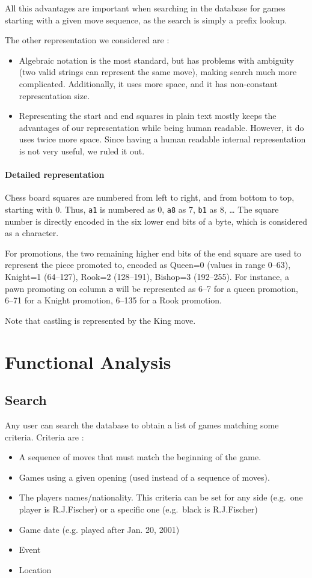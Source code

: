 \documentclass{article}
\begin{document}
All this advantages are important when searching in the database for games starting
with a given move sequence, as the search is simply a prefix lookup.

The other representation we considered are :
\begin{itemize}
\item Algebraic notation is the most standard, but has problems with ambiguity
(two valid strings can represent the same move), making search much more complicated.
Additionally, it uses more space, and it has non-constant representation size.

\item Representing the start and end squares in plain text mostly keeps the advantages
of our representation while being human readable. However, it do uses twice more space.
Since having a human readable internal representation is not very useful,
we ruled it out.
\end{itemize}


\paragraph{Detailed representation}
Chess board squares are numbered from left to right, and from bottom to top,
starting with 0. Thus, \verb|a1| is numbered as 0, \verb|a8| as 7, \verb|b1| as 8, \dots
The square number is directly encoded in the six lower end bits of a byte, which is considered as a character.

For promotions, the two remaining higher end bits of the end square are used to represent the piece promoted to,
encoded as Queen=0 (values in range 0--63), Knight=1 (64--127), Rook=2 (128--191), Bishop=3 (192--255).
For instance, a pawn promoting on column \verb|a| will be represented as 6--7 for a queen promotion,
6--71 for a Knight promotion, 6--135 for a Rook promotion.

Note that castling is represented by the King move.


\section{Functional Analysis}
\subsection{Search}
Any user can search the database to obtain a list of games matching some criteria.
Criteria are :
\begin{itemize}[noitemsep]
\item A sequence of moves that must match the beginning of the game.
\item Games using a given opening (used instead of a sequence of moves).
\item The players names/nationality. This criteria can be set for any side
(e.g.\ one player is R.J.Fischer) or a specific one (e.g.\ black is R.J.Fischer)
\item Game date (e.g. played after Jan. 20, 2001)
\item Event
\item Location
\end{itemize}
\end{document}
